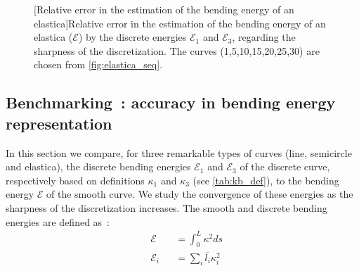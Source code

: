 \begin{figure}[p]
\begin{fullpage}
{		\label{plot:bench_elastica_vertex}}\hspace{5mm}
	\vspace{8pt}
	[Relative error in the estimation of the bending energy of an elastica]{Relative error in the estimation of the bending energy of an elastica ($\mathcal{E}$) by the discrete energies $\mathcal{E}_1$ and $\mathcal{E}_3$, regarding the sharpness of the discretization. The curves (1,5,10,15,20,25,30) are chosen from \cref{fig:elastica_seq}.}
	\label{fig:bench_elastica}
\end{fullpage}
\end{figure}


\subsection{Benchmarking~: accuracy in bending energy representation}\label{sec:bench_energy}

In this section we compare, for three remarkable types of curves (line, semicircle and elastica), the discrete bending energies $\mathcal{E}_1$ and $\mathcal{E}_3$ of the discrete curve, respectively based on definitions $\kappa_1$ and $\kappa_3$ (see \cref{tab:kb_def}), to the bending energy $\mathcal{E}$ of the smooth curve. We study the convergence of these energies as the sharpness of the discretization increases. The smooth and discrete bending energies are defined as~:
\begin{subequations}
	\begin{alignat}{5}
	&\mathcal{E} &&= \int_0^L \kappa^2 ds
	\\
	&\mathcal{E}_i &&= \sum_i \overbar{l_i} \kappa_i^2
	\end{alignat}
\end{subequations}
